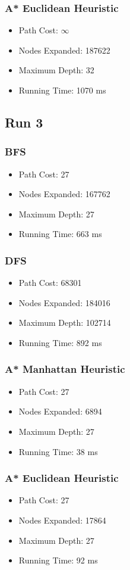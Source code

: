 \documentclass{article}
\begin{document}
		\subsubsection{A* Euclidean Heuristic}
			\begin{itemize}
				\item Path Cost:  $\infty$
				\item Nodes Expanded: 187622
				\item Maximum Depth: 32
				\item Running Time: 1070 ms
			\end{itemize}
	\subsection{Run 3}
		\begin{center}
		   \end{center}
		\subsubsection{BFS}
			\begin{itemize}
				\item Path Cost: 27
				\item Nodes Expanded: 167762
				\item Maximum Depth: 27
				\item Running Time: 663 ms
			\end{itemize}
		\subsubsection{DFS}
			\begin{itemize}
				\item Path Cost: 68301
				\item Nodes Expanded: 184016
				\item Maximum Depth: 102714
				\item Running Time: 892 ms
			\end{itemize}
		\subsubsection{A* Manhattan Heuristic}
			\begin{itemize}
				\item Path Cost: 27
				\item Nodes Expanded: 6894
				\item Maximum Depth: 27
				\item Running Time: 38 ms
			\end{itemize}
		\subsubsection{A* Euclidean Heuristic}
			\begin{itemize}
				\item Path Cost: 27
				\item Nodes Expanded: 17864
				\item Maximum Depth: 27
				\item Running Time: 92 ms
			\end{itemize}
\end{document}
